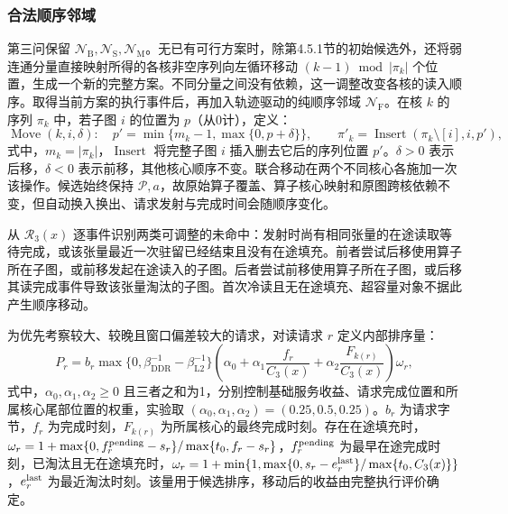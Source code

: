 \subsubsection{合法顺序邻域}
第三问保留 $\mathcal N_{\mathrm B},\mathcal N_{\mathrm S},\mathcal N_{\mathrm M}$。无已有可行方案时，除第4.5.1节的初始候选外，还将弱连通分量直接映射所得的各核非空序列向左循环移动 $(k-1)\bmod|\pi_k|$ 个位置，生成一个新的完整方案。不同分量之间没有依赖，这一调整改变各核的读入顺序。取得当前方案的执行事件后，再加入轨迹驱动的纯顺序邻域 $\mathcal N_{\mathrm F}$。在核 $k$ 的序列 $\pi_k$ 中，若子图 $i$ 的位置为 $p$（从0计），定义：
\begin{equation}
 \operatorname{Move}(k,i,\delta):\quad
 p'=\min\{m_k-1,\max\{0,p+\delta\}\},\qquad
 \pi'_k=\operatorname{Insert}(\pi_k\setminus[i],i,p'),
 \label{eq:fifo_move}
\end{equation}
\noindent 式中，$m_k=|\pi_k|$，$\operatorname{Insert}$ 将完整子图 $i$ 插入删去它后的序列位置 $p'$。$\delta>0$ 表示后移，$\delta<0$ 表示前移，其他核心顺序不变。联合移动在两个不同核心各施加一次该操作。候选始终保持 $\mathcal P,a$，故原始算子覆盖、算子核心映射和原图跨核依赖不变，但自动换入换出、请求发射与完成时间会随顺序变化。

从 $\mathcal R_3(x)$ 逐事件识别两类可调整的未命中：发射时尚有相同张量的在途读取等待完成，或该张量最近一次驻留已经结束且没有在途填充。前者尝试后移使用算子所在子图，或前移发起在途读入的子图。后者尝试前移使用算子所在子图，或后移其读完成事件导致该张量淘汰的子图。首次冷读且无在途填充、超容量对象不据此产生顺序移动。

为优先考察较大、较晚且窗口偏差较大的请求，对读请求 $r$ 定义内部排序量：
\begin{equation}
 P_r=b_r\max\{0,\beta_{\mathrm{DDR}}^{-1}-\beta_{\mathrm{L2}}^{-1}\}
 \left(\alpha_0+\alpha_1\frac{f_r}{C_3(x)}+\alpha_2\frac{F_{k(r)}}{C_3(x)}\right)\omega_r,
 \label{eq:fifo_priority}
\end{equation}
\noindent 式中，$\alpha_0,\alpha_1,\alpha_2\ge0$ 且三者之和为1，分别控制基础服务收益、请求完成位置和所属核心尾部位置的权重，实验取 $(\alpha_0,\alpha_1,\alpha_2)=(0.25,0.5,0.25)$。$b_r$ 为请求字节，$f_r$ 为完成时刻，$F_{k(r)}$ 为所属核心的最终完成时刻。存在在途填充时，$\omega_r=1+\max\{0,f_r^{\rm pending}-s_r\}/\max\{t_0,f_r-s_r\}$，$f_r^{\rm pending}$ 为最早在途完成时刻，已淘汰且无在途填充时，$\omega_r=1+\min\{1,\max\{0,s_r-e_r^{\rm last}\}/\max\{t_0,C_3(x)\}\}$，$e_r^{\rm last}$ 为最近淘汰时刻。该量用于候选排序，移动后的收益由完整执行评价确定。

